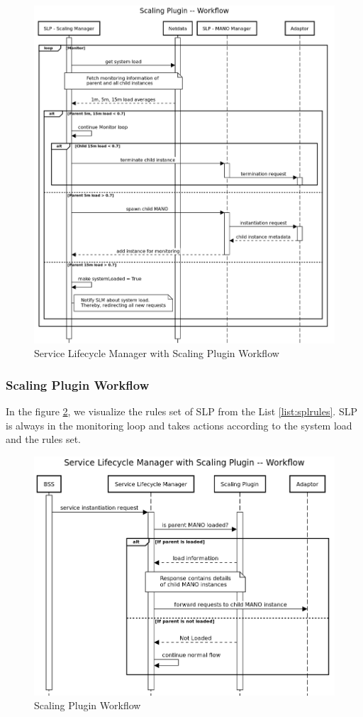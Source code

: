 \begin{figure}[h]
	\centering
	\includegraphics[width=1\linewidth]{figures/slpslmworkflow}
	\caption{Service Lifecycle Manager with Scaling Plugin Workflow}
	\label{fig:slpslmworkflow}
\end{figure}

\subsubsection{Scaling Plugin Workflow}

In the figure \ref{fig:splworkflow}, we visualize the rules set of SLP from the List \ref{list:splrules}. SLP is always in the monitoring loop and takes actions according to the system load and the rules set. 

\begin{figure}[h]
	\centering
	\includegraphics[width=1\linewidth]{figures/SPLWorkflow}
	\caption{Scaling Plugin Workflow}
	\label{fig:splworkflow}
\end{figure}

